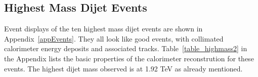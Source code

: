 \subsection{Highest Mass Dijet Events}

Event displays of the ten highest mass dijet events are shown in 
Appendix~\ref{appEvents}.  They all look like good events, with
collimated calorimeter energy deposits and associated tracks.  Table~\ref{table_highmass2} in the 
Appendix lists the basic properties of 
the calorimeter reconstrution for these events.  
The highest
dijet mass observed is at 1.92 TeV as already mentioned. 




\clearpage

